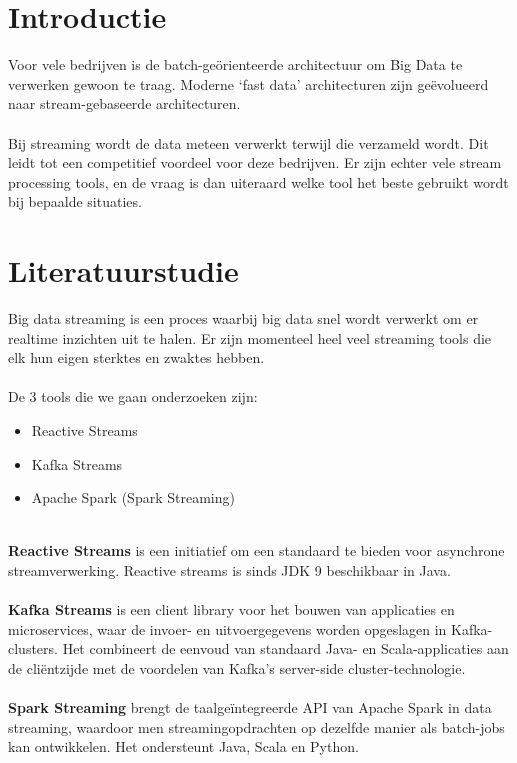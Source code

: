
\section{Introductie} %
\label{sec:introductie}

Voor vele bedrijven is de batch-geörienteerde architectuur om Big Data te verwerken gewoon te traag. Moderne ‘fast data’ architecturen zijn geëvolueerd naar stream-gebaseerde architecturen.
\\ \\
Bij streaming wordt de data meteen verwerkt terwijl die verzameld wordt. Dit leidt tot een competitief voordeel voor deze bedrijven.
Er zijn echter vele stream processing tools, en de vraag is dan uiteraard welke tool het beste gebruikt wordt bij bepaalde situaties.



\section{Literatuurstudie}
\label{sec:Literatuurstudie}

Big data streaming is een proces waarbij big data snel wordt verwerkt om er realtime inzichten uit te halen. Er zijn momenteel heel veel streaming tools die elk hun eigen sterktes en zwaktes hebben.
\\ \\
De 3 tools die we gaan onderzoeken zijn:
\begin{itemize}
	\item Reactive Streams
	\item Kafka Streams
	\item Apache Spark (Spark Streaming)
\end{itemize}

\ \\
\textbf{Reactive Streams} is een initiatief om een standaard te bieden voor asynchrone streamverwerking. Reactive streams is sinds JDK 9 beschikbaar in Java.
\\ \\
\textbf{Kafka Streams} is een client library voor het bouwen van applicaties en microservices, waar de invoer- en uitvoergegevens worden opgeslagen in Kafka-clusters. Het combineert de eenvoud van standaard Java- en Scala-applicaties aan de cliëntzijde met de voordelen van Kafka's server-side cluster-technologie.
\\ \\
\textbf{Spark Streaming} brengt de taalgeïntegreerde API van Apache Spark in data streaming, waardoor men streamingopdrachten op dezelfde manier als batch-jobs kan ontwikkelen. Het ondersteunt Java, Scala en Python.

